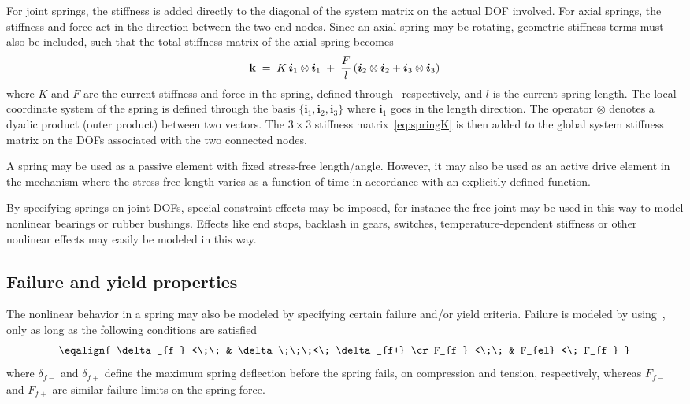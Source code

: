 For joint springs, the stiffness is added directly to the diagonal of
the system matrix on the actual DOF involved.
For axial springs, the stiffness and force act in the direction between
the two end nodes.
Since an axial spring may be rotating, geometric stiffness terms must also be
included, such that the total stiffness matrix of the axial spring becomes
%
\begin{equation}
\label{eq:springK}
{\bf k} \;=\; K\,\mbox{\boldmath $i$}_1\otimes\mbox{\boldmath $i$}_1 \;+\;
\frac{F}{l} \left(\mbox{\boldmath $i$}_2\otimes\mbox{\boldmath $i$}_2 + \mbox{\boldmath $i$}_3\otimes\mbox{\boldmath $i$}_3\right)
\end{equation}
%
where $K$ and $F$ are the current stiffness and force in the spring,
defined through~ respectively,
and $l$ is the current spring length.
The local coordinate system of the spring is defined through the basis
$\{\bm{i}_1,\bm{i}_2,\bm{i}_3\}$ where $\bm{i}_1$ goes in the length direction.
The operator $\otimes$ denotes a dyadic product (outer product)
between two vectors.
The $3\times3$ stiffness matrix~\eqref{eq:springK} is then added to the global
system stiffness matrix on the DOFs associated with the two connected nodes.

A spring may be used as a passive element with fixed stress-free length/angle.
However, it may also be used as an active drive element in the mechanism where
the stress-free length varies as a function of time in accordance with an
explicitly defined function.

By specifying springs on joint DOFs, special constraint effects may be imposed,
for instance the free joint may be used in this way to model nonlinear bearings
or rubber bushings.
Effects like end stops, backlash in gears, switches, temperature-dependent
stiffness or other nonlinear effects may easily be modeled in this way.

\subsection{Failure and yield properties}

The nonlinear behavior in a spring may also be modeled by specifying certain
failure and/or yield criteria.
Failure is modeled by using~,
only as long as the following conditions are satisfied
%
\begin{equation}
\eqalign{
\delta_{f-} <\;\; & \delta \;\;\;<\; \delta_{f+} \cr
F_{f-} <\;\; & F_{el} <\; F_{f+}
}\label{eq:failure criteria}
\end{equation}
%
where $\delta_{f-}$ and $\delta_{f+}$ define the maximum spring deflection
before the spring fails, on compression and tension, respectively, whereas
$F_{f-}$ and $F_{f+}$ are similar failure limits on the spring force.

